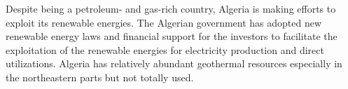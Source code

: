 \documentclass[a0,portrait]{a0poster}
\begin{document}
\begin{multicols}{3}
Despite being a petroleum- and gas-rich country, Algeria is making efforts to exploit its renewable energies. The Algerian government has adopted new renewable energy laws and financial support for the investors to facilitate the exploitation of the renewable energies for electricity production and direct utilizations. Algeria has relatively abundant geothermal resources especially in the northeastern parts but not totally used.



\color{Black} %


\end{multicols}
\end{document}

